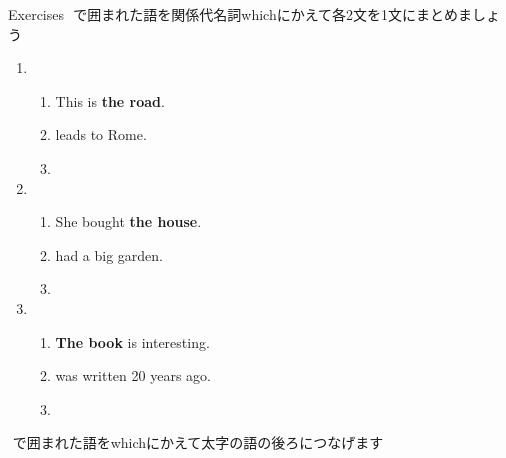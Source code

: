 \documentclass[aspectratio=169,xcolor={dvipsnames,table}]{beamer}
\begin{document}
\begin{frame}[plain]{Exercises}
\fbox{　　}\,\,で囲まれた語を関係代名詞whichにかえて各2文を1文にまとめましょう
\begin{enumerate}
 \item \begin{enumerate}
	\item This is {\bfseries the road}.
	\item {} leads to Rome.
	\item {}
       \end{enumerate}
 \item \begin{enumerate}
	\item She bought {\bfseries the house}.
	\item {} had a big garden.
	\item {}
       \end{enumerate}
 \item \begin{enumerate}
	\item {\bfseries The book} is interesting.
	\item {} was written 20 years ago.
	\item {}
       \end{enumerate}
\end{enumerate} 

\fbox{　　}\,\,で囲まれた語をwhichにかえて太字の語の後ろにつなげます
\end{frame}
\end{document}
